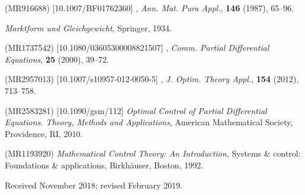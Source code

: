 \documentclass{dcds-bOF}
\theoremstyle{definition}
\begin{document}
\begin{thebibliography}{99}
 (MR916688) [10.1007/BF01762360]
\newblock {},
\newblock \emph{Ann. Mat. Pura Appl.}, \textbf{146} (1987), 65--96.

\newblock \emph{Marktform und {G}leichgewicht},
\newblock Springer, 1934.

 (MR1737542) [10.1080/03605300008821507]
\newblock {},
\newblock \emph{Comm. Partial Differential Equations}, \textbf{25} (2000), 39--72.

 (MR2957013) [10.1007/s10957-012-0050-5]
\newblock {},
\newblock \emph{J. Optim. Theory Appl.}, \textbf{154} (2012), 713--758.

 (MR2583281) [10.1090/gsm/112]
\newblock \emph{Optimal Control of Partial Differential Equations. Theory, Methods and Applications},
\newblock American Mathematical Society, Providence, RI, 2010.

 (MR1193920)
\newblock \emph{Mathematical Control Theory: An Introduction,}
\newblock Systems \& control: Foundations \& applications, Birkh\"auser, Boston, 1992.


\end{thebibliography}

\medskip
Received November  2018; revised February  2019.
\medskip
\end{document}

